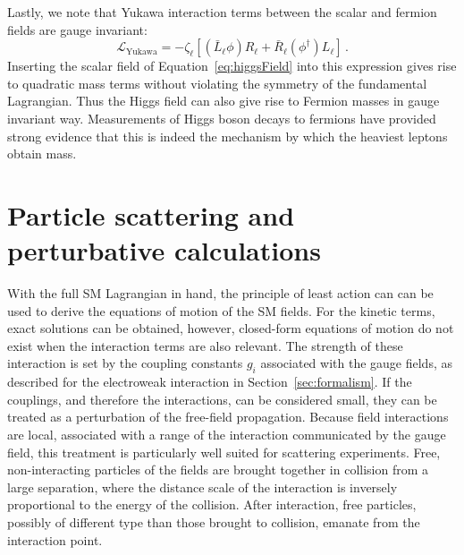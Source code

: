 Lastly, we note that Yukawa interaction terms between the scalar and fermion
fields are gauge invariant:
\begin{equation}
  \mathcal{L}_{\text{Yukawa}} = -\zeta_\ell[(\bar{L}_{\ell}\phi)R_{\ell} + \bar{R}_{\ell}(\phi^\dagger)L_{\ell}]\,.
\end{equation}
Inserting the scalar field of Equation~\ref{eq:higgsField} into this expression gives rise to quadratic mass terms
without violating the symmetry of the fundamental Lagrangian. Thus the Higgs field
can also give rise to Fermion masses in gauge invariant way. Measurements of Higgs boson decays to fermions
have provided strong evidence that this is indeed the mechanism by which the heaviest
leptons obtain mass. 

\section{Particle scattering and perturbative calculations}

With the full SM Lagrangian in hand, the principle of least action can
can be used to derive the equations of motion of the SM fields. For the kinetic
terms, exact solutions can be obtained, however, closed-form equations of motion
do not exist when the interaction terms are also relevant.
The strength of these interaction is set by the coupling constants $g_i$
associated with the gauge fields, as described for the electroweak interaction
in Section~\ref{sec:formalism}. If the couplings, and therefore the interactions, can be 
considered small, they can be treated as a perturbation of the free-field
propagation. Because field interactions are local, associated with 
a range of the interaction communicated by the gauge field,
this treatment is particularly well suited for scattering experiments.
Free, non-interacting particles of the fields are brought together in collision 
from a large separation, where the distance scale of the interaction 
is inversely proportional to the energy of the collision. After interaction,
free particles, possibly of different type than those brought to collision,
emanate from the interaction point.

